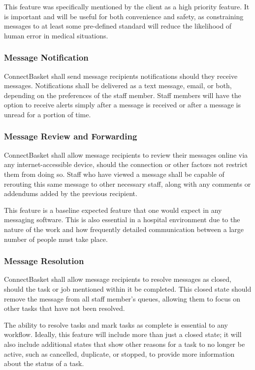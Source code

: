 \documentclass[onecolumn, draftclsnofoot,10pt, compsoc]{IEEEtran}
\begin{document}
This feature was specifically mentioned by the client as a high priority feature. It is important and will be useful for both convenience and safety, as constraining messages to at least some pre-defined standard will reduce the likelihood of human error in medical situations.

\subsubsection{Message Notification}
ConnectBasket shall send message recipients notifications should they receive messages. Notifications shall be delivered as a text message, email, or both, depending on the preferences of the staff member. Staff members will have the option to receive alerts simply after a message is received or after a message is unread for a portion of time.

\subsubsection{Message Review and Forwarding}
ConnectBasket shall allow message recipients to review their messages online via any internet-accessible device, should the connection or other factors not restrict them from doing so. Staff who have viewed a message shall be capable of rerouting this same message to other necessary staff, along with any comments or addendums added by the previous recipient. 

This feature is a baseline expected feature that one would expect in any messaging software. This is also essential in a hospital environment due to the nature of the work and how frequently detailed communication between a large number of people must take place.

\subsubsection{Message Resolution}
ConnectBasket shall allow message recipients to resolve messages as closed, should the task or job mentioned within it be completed. This closed state should remove the message from all staff member's queues, allowing them to focus on other tasks that have not been resolved.
	
The ability to resolve tasks and mark tasks as complete is essential to any workflow. Ideally, this feature will include more than just a closed state; it will also include additional states that show other reasons for a task to no longer be active, such as cancelled, duplicate, or stopped, to provide more information about the status of a task.
\end{document}
